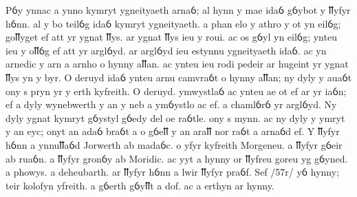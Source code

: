 \begin{spacing}{1}
\begin{pages}
\begin{Rightside}
      \pend
      \pstart
      Pỽy ynnac a ynno kymryt ygneityaeth arnaỽ; al hynn y mae idaỽ gỽybot y ỻyfyr hỽnn. al y bo teilỽg idaỽ kymryt ygneityaeth. a phan elo y athro y ot yn eilỽg; goỻyget ef att yr ygnat ỻys. ar ygnat ỻys ieu y roui. ac os gỽyl yn eilỽg; ynteu ieu y oỻỽg ef att yr arglỽyd. ar arglỽyd ieu estynnu ygneityaeth idaỽ. ac yn arnedic y arn a arnho o hynny aỻan. ac ynteu ieu rodi pedeir ar hugeint yr ygnat ỻys yn y byr. O deruyd idaỽ ynteu arnu camvraỽt o hynny aỻan; ny dyly y auaỽt ony s pryn yr y erth kyfreith. O deruyd. ymwystlaỽ ac ynteu ae ot ef ar yr iaỽn; ef a dyly wynebwerth y an y neb a ymỽystlo ac ef. a chamlỽrỽ yr arglỽyd. Ny dyly ygnat kymryt gỽystyl gỽedy del oe raỽtle. ony s mynn. ac ny dyly y ymryt y an eyc; onyt an adaỽ braỽt a o gỽeỻ y an araỻ nor raỽt a arnaỽd ef.
      \pend
      \pstart
      Y ỻyfyr hỽnn a ynnuỻaỽd Jorwerth ab madaỽc. o yfyr kyfreith Morgeneu. a ỻyfyr gỽeir ab ruaỽn. a ỻyfyr gronỽy ab Moridic. ac yyt a hynny or ỻyfreu goreu yg gỽyned. a phowys. a deheubarth. ar ỻyfyr hỽnn a lwir ỻyfyr praỽf. Sef \textup{/57r/} yỽ hynny; teir kolofyn yfreith. a gỽerth gỽyỻt a dof. ac a erthyn ar hynny.
      \pend
      \endnumbering
    \end{Rightside}
  \end{pages} 
  \Pages
\end{spacing}

